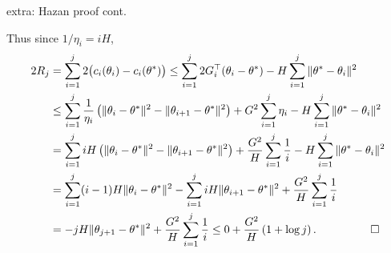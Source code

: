 \documentclass[xcolor={svgnames},
               hyperref={colorlinks,citecolor=DeepPink4,linkcolor=FireBrick,urlcolor=Maroon}]
               {beamer}
\begin{document}
\begin{frame}{extra: Hazan proof \alert{cont.}}

Thus since $1/\eta_i = i H$,
\begin{align*}
2 R_j &= \sum_{i=1}^j 2 \big(c_i(\theta_i) - c_i(\theta^*)\big) \le \sum_{i=1}^j 2 G_i^\top (\theta_i - \theta^*) - H \sum_{i=1}^j \|\theta^* - \theta_i\|^2 \\
    &\le \sum_{i=1}^j \frac{1}{\eta_i} \left(\|\theta_i - \theta^*\|^2 - \|\theta_{i+1} - \theta^*\|^2\right) + G^2 \sum_{i=1}^j \eta_i - H \sum_{i=1}^j \|\theta^* - \theta_i\|^2 \\
    &= \sum_{i=1}^j i H \left(\|\theta_i - \theta^*\|^2 - \|\theta_{i+1} - \theta^*\|^2\right) + \frac{G^2}{H} \sum_{i=1}^j \frac{1}{i} - H \sum_{i=1}^j \|\theta^* - \theta_i\|^2 \\
    &= \sum_{i=1}^j (i-1) H \|\theta_i - \theta^*\|^2 - \sum_{i=1}^j i H  \|\theta_{i+1} - \theta^*\|^2 + \frac{G^2}{H} \sum_{i=1}^j \frac{1}{i} \\
    &= - j H  \|\theta_{j+1} - \theta^*\|^2 + \frac{G^2}{H} \sum_{i=1}^j \frac{1}{i} \le 0 + \frac{G^2}{H} \left(1 + \log j\right). \hspace{10mm} \qed
\end{align*}
\end{frame}
\end{document}
